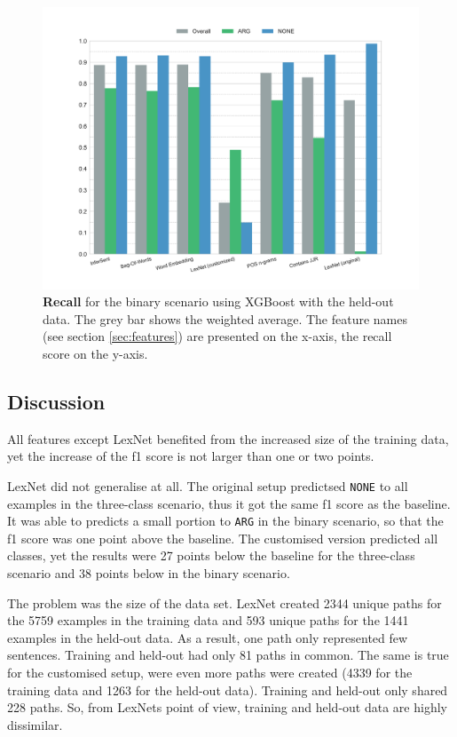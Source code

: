     \begin{figure}[htbp]
              \caption{\textbf{Recall} for the binary scenario using XGBoost with the held-out data. The grey bar shows the weighted average. The feature names (see section \ref{sec:features}) are presented on the x-axis, the recall score on the y-axis.} 
       \label{fig:h_2_rec}
 \centering
	\includegraphics[width=0.9\linewidth]{images/heldout/h-recall-True}

\end{figure}
\FloatBarrier
\subsection{Discussion}
All features except LexNet benefited from the increased size of the training data, yet the increase of the f1 score is not larger than one or two points.\newline

LexNet did not generalise at all. The original setup predictsed \texttt{NONE} to all examples in the three-class scenario, thus it got the same f1 score as the baseline. It was able to predicts a small portion to \texttt{ARG} in the binary scenario, so that the f1 score was one point above the baseline. The customised version predicted all classes, yet the results were 27 points below the baseline for the three-class scenario and 38 points below in the binary scenario.

The problem was the size of the data set. LexNet created 2344 unique paths for the 5759 examples in the training data and 593 unique paths for the 1441 examples in the held-out data. As a result, one path only represented few sentences. Training and held-out had only 81 paths in common. The same is true for the customised setup, were even more paths were created (4339 for the training data and 1263 for the held-out data). Training and held-out only shared 228 paths. So, from LexNets point of view, training and held-out data are highly dissimilar.

